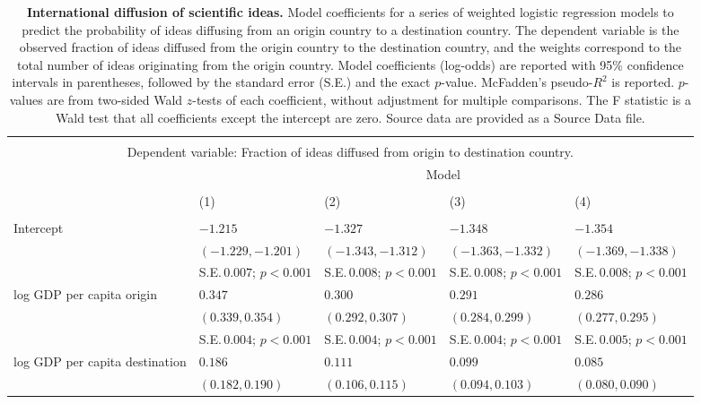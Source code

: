 \begin{table}[H] \centering 
    \small
  \caption{\textbf{International diffusion of scientific ideas.}
Model coefficients for a series of weighted logistic regression models to predict the probability of ideas diffusing from an origin country to a destination country. The dependent variable is the observed fraction of ideas diffused from the origin country to the destination country, and the weights correspond to the total number of ideas originating from the origin country. Model coefficients (log-odds) are reported with 95\% confidence intervals in parentheses, followed by the standard error (S.E.) and the exact $p$-value. McFadden's pseudo-$R^2$ is reported. $p$-values are from two-sided Wald $z$-tests of each coefficient, without adjustment for multiple comparisons. The F statistic is a Wald test that all coefficients except the intercept are zero. Source data are provided as a Source Data file.} 
\label{table:idea_diffusion}
\begin{adjustbox}{max width=\textwidth} 
\begin{tabular}{lllll}\\[-1.8ex]\hline 
\hline \\[-1.8ex] 
\multicolumn{5}{c}{Dependent variable: Fraction of ideas diffused from origin to destination country.} \\[0.8ex]\hline 
 & \multicolumn{4}{c}{Model}  \\ \cline{2-5} \\[-1.8ex] & (1)& (2)& (3)& (4) \\ \hline \\[-1.8ex] 
Intercept & $-1.215$ & $-1.327$ & $-1.348$ & $-1.354$\\ 
 & $(-1.229, -1.201)$ & $(-1.343, -1.312)$ & $(-1.363, -1.332)$ & $(-1.369, -1.338)$\\ 
 & S.E.\,$0.007$; ${p < 0.001}$ & S.E.\,$0.008$; ${p < 0.001}$ & S.E.\,$0.008$; ${p < 0.001}$ & S.E.\,$0.008$; ${p < 0.001}$\\ [0.8ex]  
log GDP per capita origin & $0.347$ & $0.300$ & $0.291$ & $0.286$\\ 
 & $(0.339, 0.354)$ & $(0.292, 0.307)$ & $(0.284, 0.299)$ & $(0.277, 0.295)$\\ 
 & S.E.\,$0.004$; ${p < 0.001}$ & S.E.\,$0.004$; ${p < 0.001}$ & S.E.\,$0.004$; ${p < 0.001}$ & S.E.\,$0.005$; ${p < 0.001}$\\ [0.8ex]  
log GDP per capita destination & $0.186$ & $0.111$ & $0.099$ & $0.085$\\ 
 & $(0.182, 0.190)$ & $(0.106, 0.115)$ & $(0.094, 0.103)$ & $(0.080, 0.090)$\\ 

\end{tabular}
\end{adjustbox}
\end{table}
